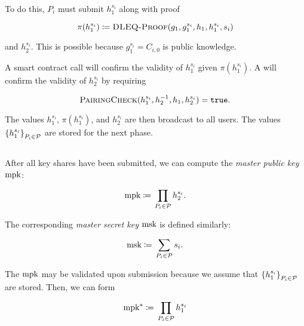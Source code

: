 To do this, $P_{i}$ must submit $h_{1}^{s_{i}}$ along with proof

\begin{equation}
    \pi(h_{1}^{s_{i}}) \coloneqq{}
        \textsc{DLEQ-Proof}(g_{1},g_{1}^{s_{i}},h_{1},h_{1}^{s_{i}},s_{i})
\end{equation}

\noindent
and $h_{2}^{s_{i}}$.
This is possible because $g_{1}^{s_{i}} = C_{i,0}$ is public knowledge.

A \gls{smart contract} call will confirm the validity of $h_{1}^{s_{i}}$
given $\pi(h_{1}^{s_{i}})$.
A \PairingCheck{} will confirm the validity of $h_{2}^{s_{i}}$
by requiring

\begin{equation}
    \textsc{PairingCheck}{}(h_{1}^{s_{i}},h_{2}^{-1},h_{1},h_{2}^{s_{i}})
        = \texttt{true}.
\end{equation}

\noindent
The values $h_{1}^{s_{i}}$, $\pi(h_{1}^{s_{i}})$, and $h_{2}^{s_{i}}$
are then broadcast to all users.
The values $\left\{ h_{1}^{s_{i}} \right\}_{P_{i}\in\mathcal{P}}$ are stored
for the next phase.


\subsection{\MPKSubmission{}}
\label{ssec:secret_dkg_mpk}

After all key shares have been submitted, we can compute
the \emph{master public key} $\textrm{mpk}{}$:

\begin{equation}
    \textrm{mpk}{} \coloneqq{} \prod_{P_{i}\in\mathcal{P}} h_{2}^{s_{i}}.
\end{equation}

\noindent
The corresponding \emph{master secret key} $\textrm{msk}{}$ is defined
similarly:

\begin{equation}
    \textrm{msk}{} \coloneqq{} \sum_{P_{i}\in\mathcal{P}} s_{i}.
    \label{eq:dkg_msk_def}
\end{equation}

The $\textrm{mpk}{}$ may be validated upon submission because we assume
that $\left\{ h_{1}^{s_{i}} \right\}_{P_{i}\in\mathcal{P}}$ are stored.
Then, we can form

\begin{equation}
    \textrm{mpk}{}^{*} \coloneqq{} \prod_{P_{i}\in\mathcal{P}} h_{1}^{s_{i}}
\end{equation}

